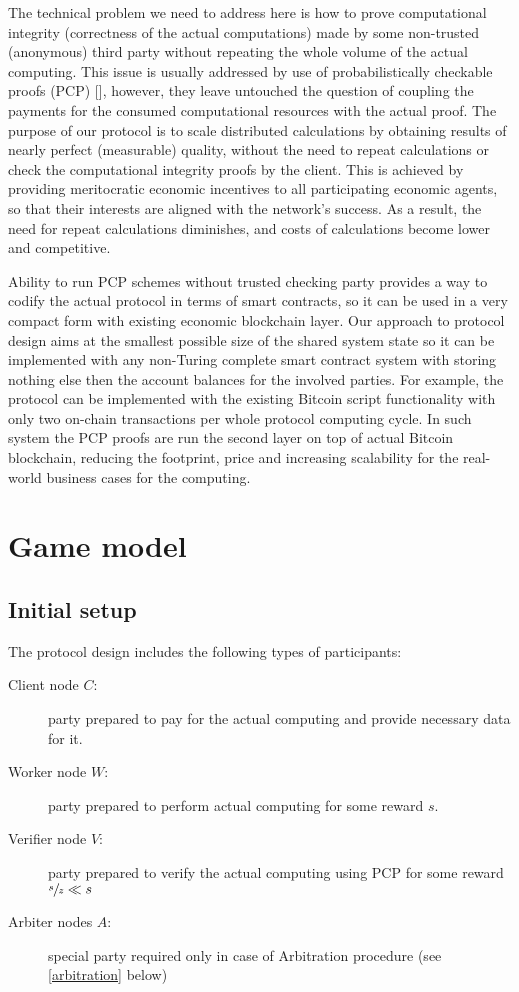 \documentclass{article}
\begin{document}
The technical problem we need to address here is how to prove computational integrity (correctness of the actual computations) made by some non-trusted (anonymous) third party without repeating the whole volume of the actual computing. This issue is usually addressed by use of probabilistically checkable proofs (PCP) [], however, they leave untouched the question of coupling the payments for the consumed computational resources with the actual proof. The purpose of our protocol is to scale distributed calculations by obtaining results of nearly perfect (measurable) quality, without the need to repeat calculations or check the computational integrity proofs by the client. This is achieved by providing meritocratic economic incentives to all participating economic agents, so that their interests are aligned with the network's success. As a result, the need for repeat calculations diminishes, and costs of calculations become lower and competitive.

Ability to run PCP schemes without trusted checking party provides a way to codify the actual protocol in terms of smart contracts, so it can be used in a very compact form with existing economic blockchain layer. Our approach to protocol design aims at the smallest possible size of the shared system state so it can be implemented with any non-Turing complete smart contract system with storing nothing else then the account balances for the involved parties. For example, the protocol can be implemented with the existing Bitcoin script functionality with only two on-chain transactions per whole protocol computing cycle. In such system the PCP proofs are run the second layer on top of actual Bitcoin blockchain, reducing the footprint, price and increasing scalability for the real-world business cases for the computing. 


\section{Game model}
\label{gamemodel}

\subsection{Initial setup}
\label{setup}

The protocol design includes the following types of participants:
\begin{description}
    \item[Client node $C$:] party prepared to pay for the actual computing and provide necessary data for it.
    \item[Worker node $W$:] party prepared to perform actual computing for some reward $s$.
    \item[Verifier node $V$:] party prepared to verify the actual computing using PCP for some reward $\sfrac{s}{z} \ll s$
    \item[Arbiter nodes $A$:] special party required only in case of \Gls{Arbitration} procedure (see \ref{arbitration} below)
\end{description}
\end{document}
